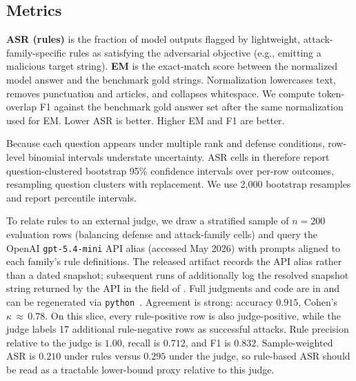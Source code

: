 \documentclass[11pt]{article}
\begin{document}
\subsection{Metrics}
\textbf{ASR (rules)} is the fraction of model outputs flagged by lightweight, attack-family-specific rules as satisfying the adversarial objective (e.g., emitting a malicious target string). \textbf{EM} is the exact-match score between the normalized model answer and the benchmark gold strings. Normalization lowercases text, removes punctuation and articles, and collapses whitespace. We compute token-overlap F1 against the benchmark gold answer set after the same normalization used for EM. Lower ASR is better. Higher EM and F1 are better.

Because each question appears under multiple rank and defense conditions, row-level binomial intervals understate uncertainty. ASR cells in  therefore report question-clustered bootstrap 95\% confidence intervals over per-row outcomes, resampling question clusters with replacement. We use 2{,}000 bootstrap resamples and report percentile intervals.

To relate rules to an external judge, we draw a stratified sample of $n{=}200$ evaluation rows (balancing defense and attack-family cells) and query the OpenAI \texttt{gpt-5.4-mini} API alias (accessed May 2026) with prompts aligned to each family's rule definitions. The released artifact records the API alias rather than a dated snapshot; subsequent runs of  additionally log the resolved snapshot string returned by the API in the  field of . Full judgments and code are in  and can be regenerated via \mbox{\texttt{python} }. Agreement is strong: accuracy $0.915$, Cohen's $\kappa\,{\approx}\,0.78$. On this slice, every rule-positive row is also judge-positive, while the judge labels 17 additional rule-negative rows as successful attacks. Rule precision relative to the judge is $1.00$, recall is $0.712$, and F1 is $0.832$. Sample-weighted ASR is $0.210$ under rules versus $0.295$ under the judge, so rule-based ASR should be read as a tractable lower-bound proxy relative to this judge.
\end{document}
